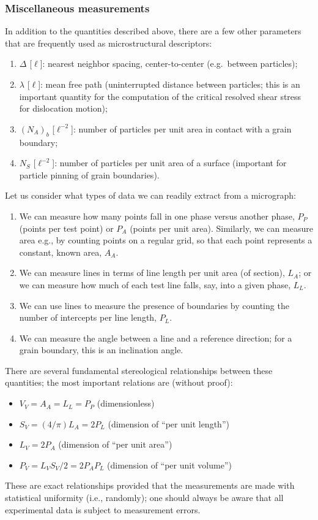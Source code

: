 \subsubsection{Miscellaneous measurements}
In addition to the quantities described above, there are a few other parameters that are frequently used as microstructural descriptors:
\begin{enumerate}
\item $\Delta$ [$\ell$]: nearest neighbor spacing, center-to-center (e.g.\ between particles);
\item $\lambda$  [$\ell$]: mean free path (uninterrupted distance between particles; this is an important quantity for the computation of the critical resolved shear stress for dislocation motion);
\item $(N_A)_b$  [$\ell^{-2}$]: number of particles per unit area in contact with a grain boundary;
\item $N_S$  [$\ell^{-2}$]: number of particles per unit area of a surface (important for particle pinning of grain boundaries).
\end{enumerate}





\noindent Let us consider what types of data we can readily extract from a micrograph:
\begin{enumerate}
\item We can measure how many points fall in one phase versus another phase, $P_P$ (points per test point) or $P_A$ (points per unit area). Similarly, we can measure area e.g., by counting points on a regular grid, so that each point represents a constant, known area, $A_A$.
\item We can measure lines in terms of line length per unit area (of section), $L_A$; or we can measure how much of each test line falls, say, into a given phase, $L_L$.
\item We can use lines to measure the presence of boundaries by counting the number of intercepts per line length, $P_L$.
\item We can measure the angle between a line and a reference direction; for a grain boundary, this is an inclination angle.
\end{enumerate}


\noindent There are several fundamental stereological relationships between these quantities; the most important relations are (without proof):
\begin{itemize}
	\item $V_V=A_A=L_L=P_P$ (dimensionless) 
	\item $S_V = (4/\pi)L_A = 2P_L$ (dimension of ``per unit length'')
	\item $L_V=2P_A$ (dimension of ``per unit area'')
	\item $P_V = L_VS_V/2 = 2P_AP_L$ (dimension of ``per unit volume'')
\end{itemize}
These are exact relationships provided that the measurements are made with statistical uniformity (i.e., randomly); one should always be aware that all experimental data is subject to measurement errors.

